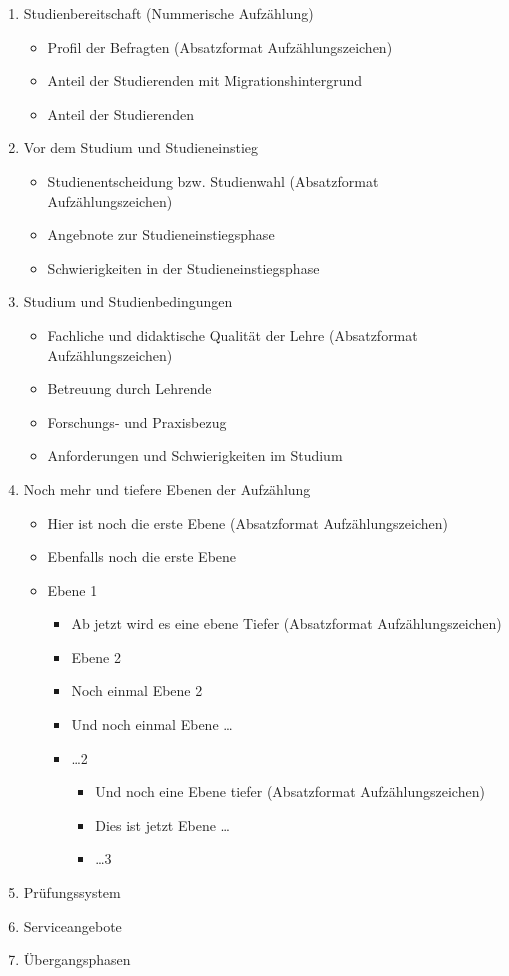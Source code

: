 \documentclass[11pt, rgb]{scrreprt}
\begin{document}
\begin{enumerate}
\item Studienbereitschaft (Nummerische Aufzählung)

\begin{itemize}
\item Profil der Befragten (Absatzformat Aufzählungszeichen)
\item Anteil der Studierenden mit Migrationshintergrund
\item Anteil der Studierenden
\end{itemize}

\item Vor dem Studium und Studieneinstieg
\begin{itemize}
\item Studienentscheidung bzw. Studienwahl (Absatzformat Aufzählungszeichen)
\item Angebnote zur Studieneinstiegsphase
\item Schwierigkeiten in der Studieneinstiegsphase
\end{itemize}

\item Studium und Studienbedingungen
\begin{itemize}
\item Fachliche und didaktische Qualität der Lehre (Absatzformat Aufzählungszeichen)
\item Betreuung durch Lehrende
\item Forschungs- und Praxisbezug
\item Anforderungen und Schwierigkeiten im Studium
\end{itemize}

\item Noch mehr und tiefere Ebenen der Aufzählung

\begin{itemize}
\item Hier ist noch die erste Ebene (Absatzformat Aufzählungszeichen)
\item Ebenfalls noch die erste Ebene
\item Ebene 1
\begin{itemize}
\item Ab jetzt wird es eine ebene Tiefer (Absatzformat Aufzählungszeichen)
\item Ebene 2
\item Noch einmal Ebene 2
\item Und noch einmal Ebene \ldots
\item \ldots 2
\begin{itemize}
\item Und noch eine Ebene tiefer (Absatzformat Aufzählungszeichen)
\item Dies ist jetzt Ebene \ldots
\item \ldots 3
\end{itemize}
\end{itemize}
\end{itemize}

\item Prüfungssystem
\item Serviceangebote
\item Übergangsphasen

\end{enumerate}
\end{document}
